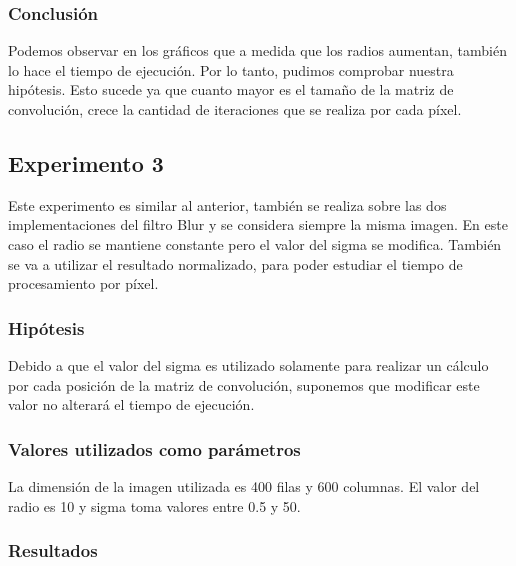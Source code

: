 		\subsubsection{Conclusión}
			Podemos observar en los gráficos que a medida que los radios aumentan, también lo hace el tiempo de ejecución. Por lo tanto, pudimos comprobar nuestra hipótesis. Esto sucede ya que cuanto mayor es el tamaño de la matriz de convolución, crece la cantidad de iteraciones que se realiza por cada píxel.

			


	\subsection{Experimento 3}
		Este experimento es similar al anterior, también se realiza sobre las dos implementaciones del filtro Blur y se considera siempre la misma imagen. En este caso el radio se mantiene constante pero el valor del sigma se modifica. También se va a utilizar el resultado normalizado, para poder estudiar el tiempo de procesamiento por píxel. 

		\subsubsection{Hipótesis} 
			Debido a que el valor del sigma es utilizado solamente para realizar un cálculo por cada posición de la matriz de convolución, suponemos que modificar este valor no alterará el tiempo de ejecución.

		\subsubsection{Valores utilizados como parámetros} 
		La dimensión de la imagen utilizada es 400 filas y 600 columnas. El valor del radio es 10 y sigma toma valores entre 0.5 y 50.

		\subsubsection{Resultados}

